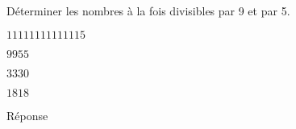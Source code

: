 \begin{exercice}
    Déterminer les nombres à la fois divisibles par 9 et par 5.
    \begin{ChoixQCM}{2}
        \item $\num{11111111111115}$
        \item $\num{9955}$
        \item $\num{3330}$
        \item $\num{1818}$
    \end{ChoixQCM}
\end{exercice}
\begin{corrige}
    Réponse  
\end{corrige}